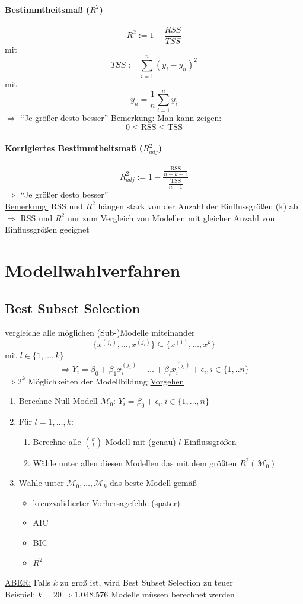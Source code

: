 \documentclass[10pt]{report}
\theoremstyle{definition}
\begin{document}
\paragraph{Bestimmtheitsmaß ($R^2$)}
\[ R^2 := 1 - \frac{RSS}{TSS} \]
mit 
\[ TSS := \sum\limits_{i=1}^n (y_i - \bar{y_n} )^2 \]
mit
\[ \bar{y_n} = \frac{1}{n} \sum\limits_{i=1}^{n}y_i \]
$\Rightarrow$ ``Je größer desto besser''
\underline{Bemerkung:} Man kann zeigen:
\[ 0 \leq \text{RSS} \leq \text{TSS} \]

\paragraph{Korrigiertes Bestimmtheitsmaß ($R^{2}_{adj}$)}
\[ R_{adj}^{2} := 1 - \frac{\frac{\text{RSS}}{n-k-1}}{\frac{\text{TSS}}{n-1}} \]
$\Rightarrow$ ``Je größer desto besser'' \\
\underline{Bemerkung:} RSS und $R^{2}$ hängen stark von der Anzahl der Einflussgrößen (k) ab\\
$\Rightarrow$ RSS und $R^{2}$ nur zum Vergleich von Modellen mit gleicher Anzahl von Einflussgrößen geeignet

\section{Modellwahlverfahren}
\subsection{Best Subset Selection}
vergleiche alle möglichen (Sub-)Modelle miteinander
\[ \{ x^{(j_1)},\dots, x^{(j_l)}\} \subseteq \{x^{(1)}, \dots, x^{k} \} \]
mit 
$l \in \{1, \dots, k \} $
\[ \Rightarrow Y_i = \beta_0 + \beta_1 x_i^{(j_1)} + \dots + \beta_l x_i^{(j_l)} + \epsilon_i , i \in \{1,..n\} \]
$\Rightarrow 2^{k} $ Möglichkeiten der Modellbildung
\underline{Vorgehen}
\begin{enumerate}
	\item Berechne Null-Modell $\mathcal{M}_0 $:
		$Y_i= \beta_0 + \epsilon_i , i \in \{1,\dots,n\} $
	\item Für $l=1,\dots,k$:
		\begin{enumerate}
			\item Berechne alle $\binom{k}{l}$ Modell mit (genau) $l$ Einflussgrößen
			\item Wähle unter allen diesen Modellen das mit dem größten $R^{2} (\mathcal{M}_0)$
		\end{enumerate}
	\item Wähle unter $\mathcal{M}_0,\dots,\mathcal{M}_k$ das beste Modell gemäß
		\begin{itemize}
			\item kreuzvalidierter Vorhersagefehle (später)
			\item AIC
			\item BIC
			\item $R^2$
		\end{itemize}
\end{enumerate}
\underline{ABER:} Falls $k$ zu groß ist, wird Best Subset Selection zu teuer \\
Beispiel: $k=20 \Rightarrow 1.048.576$ Modelle müssen berechnet werden
\end{document}
